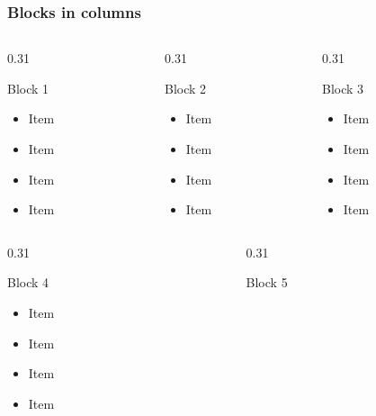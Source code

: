 \begin{frame}[t]
\frametitle{Blocks in columns}
\begin{columns}[T,onlytextwidth]
\begin{column}{0.31\textwidth}
\begin{block}{Block 1}
\begin{itemize}
\item Item
\item Item
\item Item
\item Item
\end{itemize}
\end{block}
\end{column}
\begin{column}{0.31\textwidth}
\begin{block}{Block 2}
\begin{itemize}
\item Item
\item Item
\item Item
\item Item
\end{itemize}
\end{block}
\end{column}
\begin{column}{0.31\textwidth}
\begin{block}{Block 3}
\begin{itemize}
\item Item
\item Item
\item Item
\item Item
\end{itemize}
\end{block}
\end{column}
\end{columns}
\vfill
\begin{columns}[T,onlytextwidth]
\begin{column}{0.31\textwidth}
\begin{block}{Block 4}
\begin{itemize}
\item Item
\item Item
\item Item
\item Item
\end{itemize}
\end{block}
\end{column}
\begin{column}{0.31\textwidth}
\begin{block}{Block 5}

\end{block}
\end{column}
\end{columns}
\end{frame}

